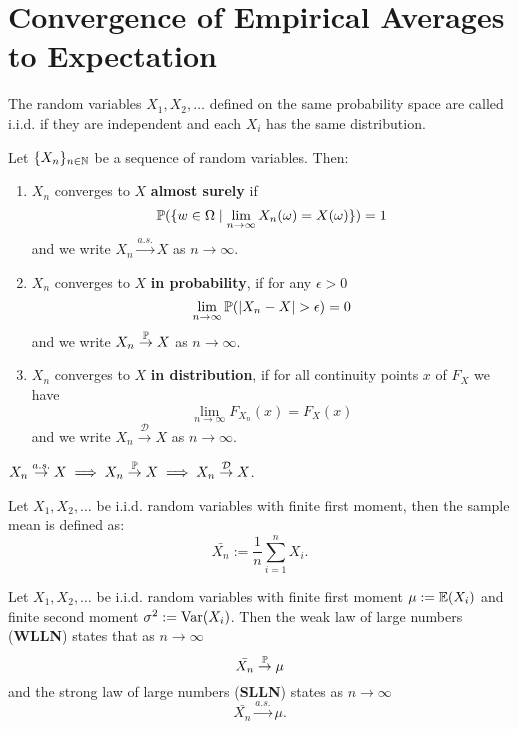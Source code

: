 \section{Convergence of Empirical Averages to Expectation}

\begin{definition*}
  The random variables \(X_1, X_2, \ldots\) defined on the same probability space are called i.i.d. if they are independent and each \(X_i\) has the same distribution.
\end{definition*}

\begin{definition*}
  Let \(\{X_n\}_{n \in \N}\) be a sequence of random variables. Then:
  \begin{enumerate}
    \item \(X_n\) converges to \(X\) \textbf{almost surely} if
    \[\P(\{w \in \Omega \mid \lim_{n\to\infty} X_n(\omega) = X(\omega)\}) = 1\]
    and we write \(X_n \stackrel{a.s.}{\to} X\) as \(n \to \infty\).
    \item \(X_n\) converges to \(X\) \textbf{in probability}, if for any \(\epsilon > 0\)
    \[\lim_{n \to \infty} \P(|X_n - X| > \epsilon) = 0\]
    and we write \(X_n \stackrel{\P}{\to} X\) as \(n \to \infty\).
    \item \(X_n\) converges to \(X\) \textbf{in distribution}, if for all continuity points \(x\) of \(F_X\) we have
    \[\lim_{n \to \infty} F_{X_n}(x) = F_X(x)\]
    and we write \(X_n \stackrel{\mathcal{D}}{\to} X\) as \(n \to \infty\).
  \end{enumerate}
\end{definition*}

\begin{lemma}
  \(X_n \stackrel{a.s.}{\to} X \implies X_n \stackrel{\P}{\to} X \implies X_n \stackrel{\mathcal{D}}{\to} X\).
\end{lemma}

\begin{definition*}
    Let \(X_1, X_2, \ldots\) be i.i.d. random variables with finite first moment, then the sample mean is defined as:
    \[\bar{X_n} := \frac{1}{n}\sum_{i=1}^n X_i.\]
\end{definition*}

\pagebreak
\begin{theorem*}
  Let \(X_1, X_2, \ldots\) be i.i.d. random variables with finite first moment \(\mu := \E(X_i)\) and finite second moment \(\sigma^2 := \Var(X_i)\). Then the weak law of large numbers (\textbf{WLLN}) states that as \(n \to \infty\)
  \[\bar{X_n} \stackrel{\P}{\to} \mu\]
  and the strong law of large numbers (\textbf{SLLN}) states as \(n \to \infty\)
  \[\bar{X_n} \stackrel{a.s.}{\to} \mu.\]
\end{theorem*}

